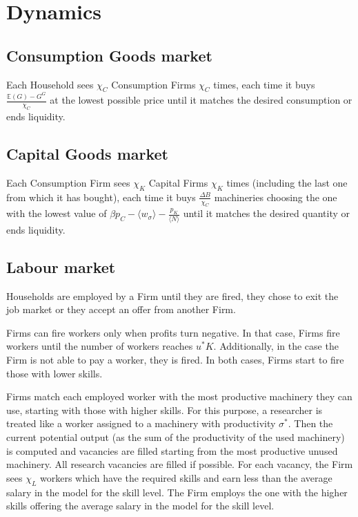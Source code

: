 \documentclass[a4paper, headings=standardclasses]{scrartcl}
\begin{document}
\section{Dynamics}
\subsection{Consumption Goods market}
Each Household sees $\chi_C$ Consumption Firms $\chi_C$ times, each time it buys $\frac{\mathbb{E}(G) - G^G}{\chi_C}$ at the lowest possible price until it matches the desired consumption or ends liquidity.

\subsection{Capital Goods market}
Each Consumption Firm sees $\chi_K$ Capital Firms $\chi_K$ times (including the last one from which it has bought), each time it buys $\frac{\Delta B}{\chi_C}$ machineries choosing the one with the lowest value of $\beta p_C - \langle w_\sigma \rangle - \frac{p_K}{\langle N \rangle}$ until it matches the desired quantity or ends liquidity.

\subsection{Labour market}
Households are employed by a Firm until they are fired, they chose to exit the job market or they accept an offer from another Firm.

Firms can fire workers only when profits turn negative. In that case, Firms fire workers until the number of workers reaches $u^* K$. Additionally, in the case the Firm is not able to pay a worker, they is fired. In both cases, Firms start to fire those with lower skills.

Firms match each employed worker with the most productive machinery they can use, starting with those with higher skills. For this purpose, a researcher is treated like a worker assigned to a machinery with productivity $\sigma^*$.
Then the current potential output (as the sum of the productivity of the used machinery) is computed and vacancies are filled starting from the most productive unused machinery. All research vacancies are filled if possible.
For each vacancy, the Firm sees $\chi_L$ workers which have the required skills and earn less than the average salary in the model for the skill level. The Firm employs the one with the higher skills offering the average salary in the model for the skill level.
\end{document}
